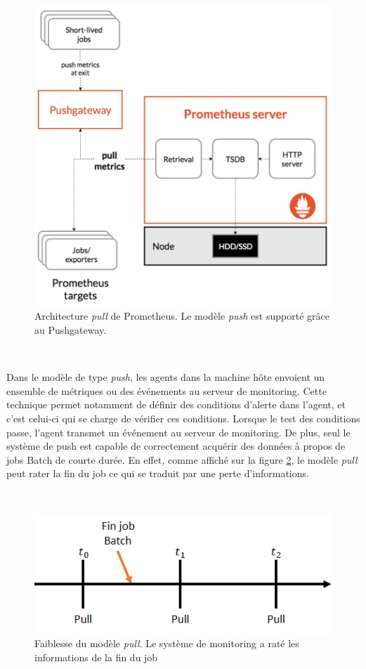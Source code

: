 \begin{figure}[ht!]
  \centering
  \includegraphics[scale=0.4]{img/state_of_the_art/prometheus_archi_simple.png}
  \caption{Architecture \textit{pull} de Prometheus. Le modèle \textit{push} est supporté grâce au Pushgateway.}
  \label{fig:archi_prom_simple}
\end{figure}

~

\noindent
Dans le modèle de type \textit{push}, les agents dans la machine hôte envoient un ensemble de métriques ou des événements au serveur de monitoring. Cette technique permet notamment de définir des conditions d’alerte dans l’agent, et c’est celui-ci qui se charge de vérifier ces conditions. Lorsque le test des conditions passe, l’agent transmet un événement au serveur de monitoring. De plus, seul le système de push est capable de correctement acquérir des données à propos de jobs Batch de courte durée. \cite{blog_monitoring, prometheus_tuto} En effet, comme affiché sur la figure \ref{fig:batch_end}, le modèle \textit{pull} peut rater la fin du job ce qui se traduit par une perte d’informations.

~

\begin{figure}[ht!]
  \centering
  \includegraphics{img/state_of_the_art/pull_batch_miss.png}
  \caption{Faiblesse du modèle \textit{pull}. Le système de monitoring a raté les informations de la fin du job}
  \label{fig:batch_end}
\end{figure}

